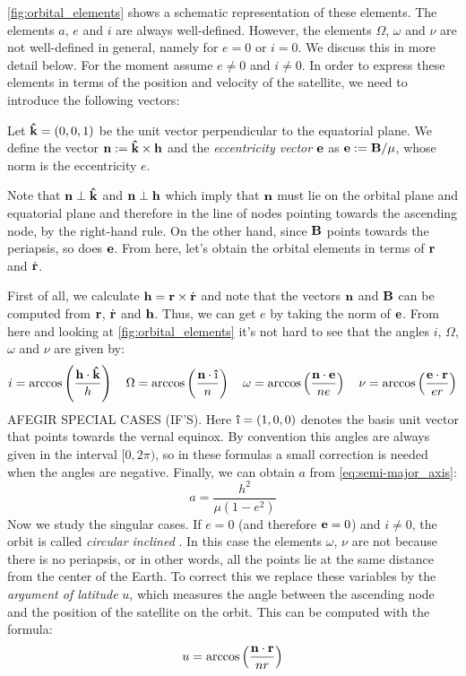 \documentclass[../main.tex]{subfiles}
\begin{document}
\cref{fig:orbital_elements} shows a schematic representation of these elements. The elements $a$, $e$ and $i$ are always well-defined. However, the elements $\Omega$, $\omega$ and $\nu$ are not well-defined in general, namely for $e=0$ or $i=0$. We discuss this in more detail below. For the moment assume $e\neq 0$ and $i\neq 0$. In order to express these elements in terms of the position and velocity of the satellite, we need to introduce the following vectors:
\begin{definition}
  Let $\boldsymbol{\mathrm{\hat{k}}}=(0,0,1)$ be the unit vector perpendicular to the equatorial plane. We define the vector $\boldsymbol{\mathrm{n}}:=\boldsymbol{\mathrm{\hat{k}}}\times \boldsymbol{\mathrm{h}}$ and the \emph{eccentricity vector} $\boldsymbol{\mathrm{e}}$ as $\boldsymbol{\mathrm{e}}:=\boldsymbol{\mathrm{B}}/\mu$, whose norm is the eccentricity $e$.
\end{definition}
Note that $\boldsymbol{\mathrm{n}}\perp \boldsymbol{\mathrm{\hat{k}}}$ and $\boldsymbol{\mathrm{n}}\perp \boldsymbol{\mathrm{h}}$ which imply that $\boldsymbol{\mathrm{n}}$ must lie on the orbital plane and equatorial plane and therefore in the line of nodes pointing towards the ascending node, by the right-hand rule. On the other hand, since $\boldsymbol{\mathrm{B}}$ points towards the periapsis, so does $\boldsymbol{\mathrm{e}}$. From here, let's obtain the orbital elements in terms of $\boldsymbol{\mathrm{r}}$ and $\dot{\boldsymbol{\mathrm{r}}}$.

First of all, we calculate $\boldsymbol{\mathrm{h}}=\boldsymbol{\mathrm{r}}\times\dot{\boldsymbol{\mathrm{r}}}$ and note that the vectors $\boldsymbol{\mathrm{n}}$ and $\boldsymbol{\mathrm{B}}$ can be computed from $\boldsymbol{\mathrm{r}}$, $\dot{\boldsymbol{\mathrm{r}}}$ and $\boldsymbol{\mathrm{h}}$. Thus, we can get $e$ by taking the norm of $\boldsymbol{\mathrm{e}}$. From here and looking at \cref{fig:orbital_elements} it's not hard to see that the angles $i$, $\Omega$, $\omega$ and $\nu$ are given by:
\begin{equation}
  i=\arccos\left(\frac{\vf{h}\cdot \vf{\hat{k}}}{h}\right)\quad \Omega=\arccos\left(\frac{\vf{n}\cdot \vf{\hat{\text\i}}}{n}\right)\quad \omega=\arccos\left(\frac{\vf{n}\cdot \vf{e}}{ne}\right)\quad \nu=\arccos\left(\frac{\vf{e}\cdot \vf{r}}{er}\right)
\end{equation}
AFEGIR SPECIAL CASES (IF'S).
Here $\vf{\hat{\text\i}}=(1,0,0)$ denotes the basis unit vector that points towards the vernal equinox. By convention this angles are always given in the interval $[0,2\pi)$, so in these formulas a small correction is needed when the angles are negative. Finally, we can obtain $a$ from \cref{eq:semi-major_axis}:
\begin{equation}
  a = \frac{h^2}{\mu(1-e^2)}
\end{equation}
Now we study the singular cases. If $e=0$ (and therefore $\boldsymbol{\mathrm{e}}=0$) and $i\ne 0$, the orbit is called \emph{circular inclined} \cite{vallado}. In this case the elements $\omega$, $\nu$ are not because there is no periapsis, or in other words, all the points lie at the same distance from the center of the Earth. To correct this we replace these variables by the \emph{argument of latitude} $u$, which measures the angle between the ascending node and the position of the satellite on the orbit. This can be computed with the formula:
\begin{equation}
  u=\arccos\left(\frac{\boldsymbol{\mathrm{n}}\cdot \boldsymbol{\mathrm{r}}}{nr}\right)
\end{equation}
\end{document}
